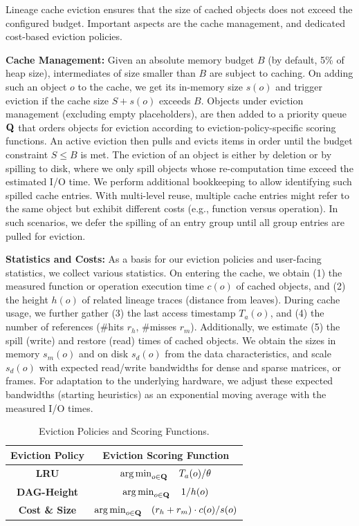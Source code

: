 Lineage cache eviction ensures that the size of cached objects does not exceed the configured budget. Important aspects are the cache management, and dedicated cost-based eviction policies.

\textbf{Cache Management:} Given an absolute memory budget $B$ (by default, 5\% of heap size), intermediates of size smaller than $B$ are subject to caching. On adding such an object $o$ to the cache, we get its in-memory size $s(o)$ and trigger eviction if the cache size $S + s(o)$ exceeds $B$. Objects under eviction management (excluding empty placeholders), are then added to a priority queue $\mathbf{Q}$ that orders objects for eviction according to eviction-policy-specific scoring functions. An active eviction then pulls and evicts items in order until the budget constraint $S \leq B$ is met. The eviction of an object is either by deletion or by spilling to disk, where we only spill objects whose re-computation time exceed the estimated I/O time. We perform additional bookkeeping to allow identifying such spilled cache entries. With multi-level reuse, multiple cache entries might refer to the same object but exhibit different costs (e.g., function versus operation). In such scenarios, we defer the spilling of an entry group until all group entries are pulled for eviction.

\textbf{Statistics and Costs:} As a basis for our eviction policies and user-facing statistics, we collect various statistics. On entering the cache, we obtain (1) the measured function or operation execution time $c(o)$ of cached objects, and (2) the height $h(o)$ of related lineage traces (distance from leaves). During cache usage, we further gather (3) the last access timestamp $T_a(o)$, and (4) the number of references (\#hits $r_h$, \#misses $r_m$). Additionally, we estimate (5) the spill (write) and restore (read) times of cached objects. We obtain the sizes in memory $s_m(o)$ and on disk $s_d(o)$ from the data characteristics, and scale $s_d(o)$ with expected read/write bandwidths for dense and sparse matrices, or frames. For adaptation to the underlying hardware, we adjust these expected bandwidths (starting heuristics) as an exponential moving average with the measured I/O times.

\begin{table}[!t]
	\centering \small \setlength\tabcolsep{12pt}
	\caption{\label{tab:evict}Eviction Policies and Scoring Functions.}
	\vspace{-0.4cm}
	\begin{tabular}{cc}
	  \toprule
		\textbf{Eviction Policy} & \textbf{Eviction Scoring Function} \\
		\midrule
    \textbf{LRU}          & $\operatorname*{arg\,min}_{o \in \mathbf{Q}} \quad T_a(o) /\theta$ \\
		\textbf{DAG-Height}   & $\operatorname*{arg\,min}_{o \in \mathbf{Q}} \quad 1/h(o)$ \\
		\textbf{Cost \& Size} & $\operatorname*{arg\,min}_{o \in \mathbf{Q}} \quad (r_h+r_m)\cdot c(o)/s(o)$\\
		\bottomrule
	\end{tabular}
	\normalsize
\end{table}

